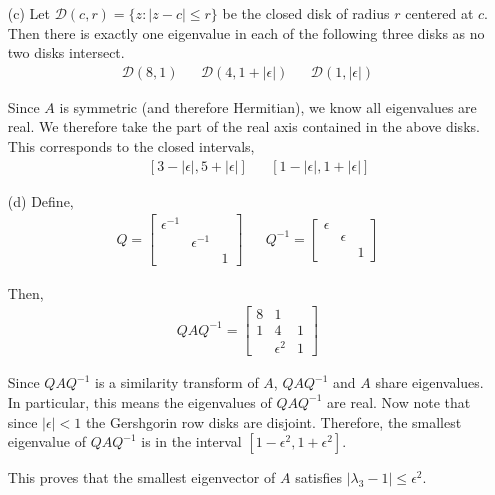 \documentclass[10pt]{article}
\begin{document}
\begin{solution}[Solution]
\begin{enumerate}
    \item[(c)] Let \( \mathcal{D}(c,r) = \{z : |z-c|\leq r\} \) be the closed disk of radius \( r \) centered at \( c \). Then there is exactly one eigenvalue in each of the following three disks as no two disks intersect.
        \begin{align*}
            \mathcal{D}(8,1) && \mathcal{D}(4,1+|\epsilon|) && \mathcal{D}(1,|\epsilon|)    
        \end{align*}

        Since \( A \) is symmetric (and therefore Hermitian), we know all eigenvalues are real. We therefore take the part of the real axis contained in the above disks. This corresponds to the closed intervals,
        \begin{align*}
            [7,9] && [3-|\epsilon|,5+|\epsilon|] && [1-|\epsilon|,1+|\epsilon|]
        \end{align*}
    
    \item[(d)]
        Define,
        \begin{align*}
            Q=
            \left[\begin{array}{rrr}
                \epsilon^{-1} & \\
                & \epsilon^{-1} \\
                & & 1
            \end{array}\right]
            && Q^{-1} =
            \left[\begin{array}{rrr}
                \epsilon\\
                & \epsilon\\
                & & 1
            \end{array}\right]
        \end{align*}

        Then,
        \begin{align*}
            QAQ^{-1} = 
            \left[\begin{array}{rrr}
                8 & 1  \\
                1 & 4 & 1 \\
                & \epsilon^2 & 1
            \end{array}\right]
        \end{align*}

        
        Since \( QAQ^{-1} \) is a similarity transform of \( A \), \( QAQ^{-1} \) and \( A \) share eigenvalues. In particular, this means the eigenvalues of \( QAQ^{-1} \) are real.  
                Now note that since \( |\epsilon|<1 \) the Gershgorin row disks are disjoint. Therefore, the smallest eigenvalue of \( QAQ^{-1} \) is in the interval \( [1-\epsilon^2,1+\epsilon^2] \).
        
        This proves that the smallest eigenvector of \( A \) satisfies \( |\lambda_3-1|\leq \epsilon^2 \).

\end{enumerate}
\end{solution}
\end{document}
